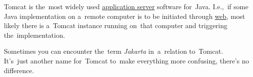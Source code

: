 \label{tomcat}
Tomcat is the~most widely used \hyperref[applicationserver]{application server} software for~Java.
I.e.,~if some Java implementation on a~remote computer is to be initiated through \hyperref[internetweb]{web}, most likely there is a~Tomcat instance running on~that computer and triggering the~implementation.

\warning Sometimes you can encounter the~term \textit{Jakarta} in~a~relation to~Tomcat.
It's~just another name for~Tomcat to~make everything more confusing, there's no difference.

